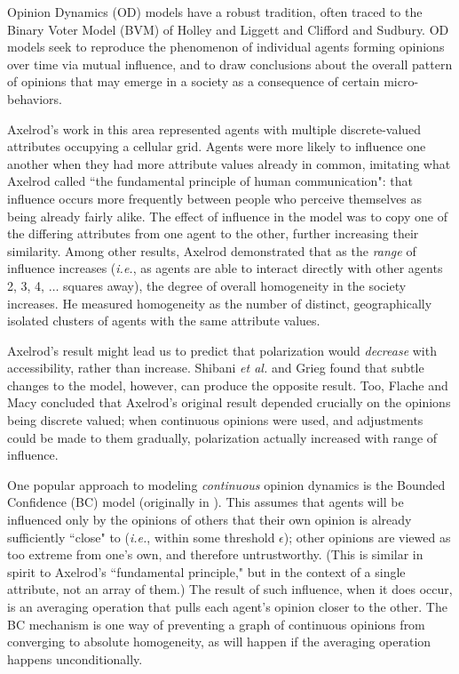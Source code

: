 
Opinion Dynamics (OD) models have a robust tradition, often traced to the
Binary Voter Model (BVM) of Holley and Liggett\cite{holley_ergodic_1975} and
Clifford and Sudbury\cite{clifford_model_1973}. OD models seek to reproduce
the phenomenon of individual agents forming opinions over time via mutual
influence, and to draw conclusions about the overall pattern of opinions that
may emerge in a society as a consequence of certain micro-behaviors.

Axelrod's work in this area\cite{axelrod_dissemination_1997} represented
agents with multiple discrete-valued attributes occupying a cellular grid.
Agents were more likely to influence one another when they had more attribute
values already in common, imitating what Axelrod called ``the fundamental
principle of human communication": that influence occurs more frequently
between people who perceive themselves as being already fairly alike. The
effect of influence in the model was to copy one of the differing attributes
from one agent to the other, further increasing their similarity. Among other
results, Axelrod demonstrated that as the \textit{range} of influence
increases (\textit{i.e.}, as agents are able to interact directly with other
agents 2, 3, 4, $\dots$ squares away), the degree of overall homogeneity in
the society increases. He measured homogeneity as the number of distinct,
geographically isolated clusters of agents with the same attribute values.

Axelrod's result might lead us to predict that polarization would
\textit{decrease} with accessibility, rather than increase. Shibani \textit{et
al.}\cite{shibanai_effects_2001} and Grieg\cite{greig_end_2002} found that
subtle changes to the model, however, can produce the opposite result. Too,
Flache and Macy\cite{flache_why_2006} concluded that Axelrod's original result
depended crucially on the opinions being discrete valued; when continuous
opinions were used, and adjustments could be made to them gradually,
polarization actually increased with range of influence.

One popular approach to modeling \textit{continuous} opinion dynamics is the
Bounded Confidence (BC) model (originally in
\cite{deffuant_mixing_2000,hegselmann_opinion_2002}). This assumes that agents
will be influenced only by the opinions of others that their own opinion is
already sufficiently ``close" to (\textit{i.e.}, within some threshold
$\epsilon$); other opinions are viewed as too extreme from one's own, and
therefore untrustworthy. (This is similar in spirit to Axelrod's ``fundamental
principle," but in the context of a single attribute, not an array of them.)
The result of such influence, when it does occur, is an averaging operation
that pulls each agent's opinion closer to the other. The BC mechanism is one
way of preventing a graph of continuous opinions from converging to absolute
homogeneity, as will happen if the averaging operation happens
unconditionally.

